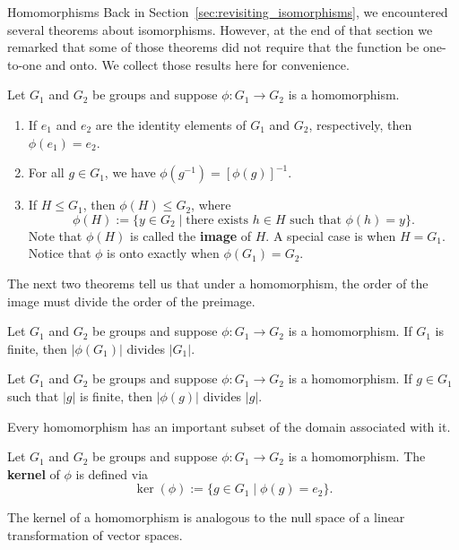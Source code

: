 \begin{section}{Homomorphisms}
Back in Section~\ref{sec:revisiting_isomorphisms}, we encountered several theorems about isomorphisms.  However, at the end of that section we remarked that some of those theorems did not require that the function be one-to-one and onto.  We collect those results here for convenience.

\begin{theorem}
Let $G_1$ and $G_2$ be groups and suppose $\phi:G_1\to G_2$ is a homomorphism.
\begin{enumerate}[label=\rm{(\alph*)}]
\item If $e_1$ and $e_2$ are the identity elements of $G_1$ and $G_2$, respectively, then $\phi(e_1)=e_2$.
\item For all $g\in G_1$, we have $\phi(g^{-1})=[\phi(g)]^{-1}$.
\item If $H\leq G_1$, then $\phi(H)\leq G_2$, where
\[
\phi(H):=\{y\in G_2\mid \text{there exists } h\in H\text{ such that }\phi(h)=y\}. 
\]
Note that $\phi(H)$ is called the \textbf{image} of $H$. A special case is when $H=G_1$. Notice that $\phi$ is onto exactly when $\phi(G_1)=G_2$.
\end{enumerate}
\end{theorem}

The next two theorems tell us that under a homomorphism, the order of the image must divide the order of the preimage.

\begin{theorem}
Let $G_1$ and $G_2$ be groups and suppose $\phi:G_1\to G_2$ is a homomorphism. If $G_1$ is finite, then $|\phi(G_1)|$ divides $|G_1|$.
\end{theorem}

\begin{theorem}
Let $G_1$ and $G_2$ be groups and suppose $\phi:G_1\to G_2$ is a homomorphism. If $g\in G_1$ such that $|g|$ is finite, then $|\phi(g)|$ divides $|g|$.
\end{theorem}

Every homomorphism has an important subset of the domain associated with it.

\begin{definition}
Let $G_1$ and $G_2$ be groups and suppose $\phi:G_1\to G_2$ is a homomorphism.  The \textbf{kernel} of $\phi$ is defined via
\[
\ker(\phi):=\{g\in G_1\mid \phi(g)=e_2\}.
\]
\end{definition}

The kernel of a homomorphism is analogous to the null space of a linear transformation of vector spaces.  


\end{section}
